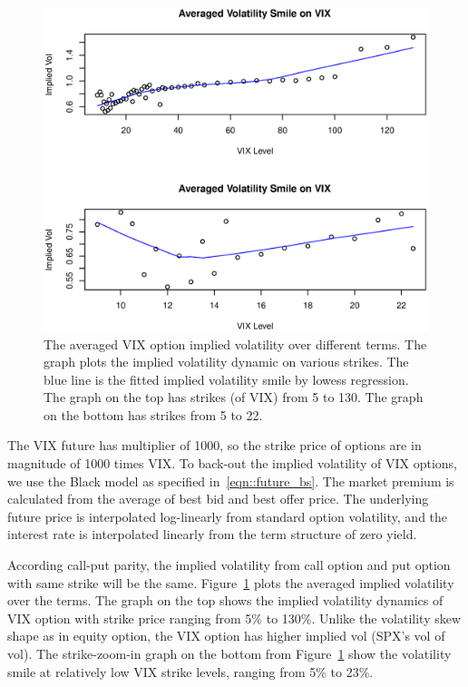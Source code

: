 \documentclass[11pt,reqno,final]{amsart}
\begin{document}
\begin{figure}
  \centering
  \includegraphics[scale=0.6]{avg_vix.eps}
  \caption{The averaged VIX option implied volatility over different terms. The graph plots the implied volatility dynamic on various strikes. The blue line is the fitted implied volatility smile by lowess regression. The graph on the top has strikes (of VIX) from 5 to 130. The graph on the bottom has strikes from 5 to 22.}\label{avg_vix}
\end{figure}

The VIX future has multiplier of 1000, so the strike price of options are in magnitude of 1000 times VIX. To back-out the implied volatility of VIX options, we use the Black model as specified in~\ref{eqn::future_bs}. The market premium is calculated from the average of best bid and best offer price. The underlying future price is interpolated log-linearly from standard option volatility, and the interest rate is interpolated linearly from the term structure of zero yield.

According call-put parity, the implied volatility from call option and put option with same strike will be the same. Figure~\ref{avg_vix} plots the averaged implied volatility over the terms. The graph on the top shows the implied volatility dynamics of VIX option with strike price ranging from 5\% to 130\%. Unlike the volatility skew shape as in equity option, the VIX option has higher implied vol (SPX's vol of vol). The strike-zoom-in graph on the bottom from Figure~\ref{avg_vix} show the volatility smile at relatively low VIX strike levels, ranging from 5\% to 23\%.
\end{document}

